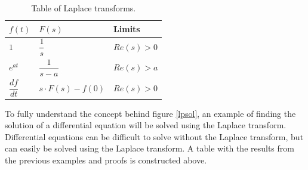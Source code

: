 \begin{table}[H]
\center
\begin{tabular}{lll}
\hline
\multicolumn{1}{|l|}{$f(t)$}           & \multicolumn{1}{l|}{$F(s)$}                & \multicolumn{1}{l|}{Limits}    \\ \hline
\multicolumn{1}{|l|}{$1$}              & \multicolumn{1}{l|}{$\dfrac{1}{s}$}        & \multicolumn{1}{l|}{$Re(s)>0$} \\ \hline
\multicolumn{1}{|l|}{$e^{at}$}         & \multicolumn{1}{l|}{$\dfrac{1}{s-a}$}      & \multicolumn{1}{l|}{$Re(s)>a$} \\ \hline
\multicolumn{1}{|l|}{$\dfrac{df}{dt}$} & \multicolumn{1}{l|}{$s \cdot F(s) - f(0)$} & \multicolumn{1}{l|}{$Re(s)>0$} \\ \hline                          
\end{tabular}
\caption{Table of Laplace transforms.}
\label{lptable}
\end{table}
\noindent To fully understand the concept behind figure \ref{lpsol}, an example of finding the solution of a differential equation will be solved using the Laplace transform. Differential equations can be difficult to solve without the Laplace transform, but can easily be solved using the Laplace transform. A table with the results from the previous examples and proofs is constructed above.

